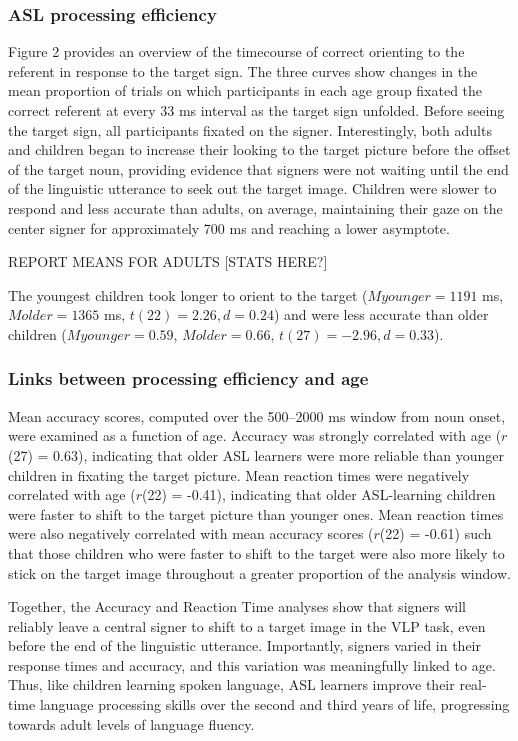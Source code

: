 \documentclass[12pt,]{article}
\begin{document}
\subsubsection{ASL processing
efficiency}\label{asl-processing-efficiency}

Figure 2 provides an overview of the timecourse of correct orienting to
the referent in response to the target sign. The three curves show
changes in the mean proportion of trials on which participants in each
age group fixated the correct referent at every 33 ms interval as the
target sign unfolded. Before seeing the target sign, all participants
fixated on the signer. Interestingly, both adults and children began to
increase their looking to the target picture before the offset of the
target noun, providing evidence that signers were not waiting until the
end of the linguistic utterance to seek out the target image. Children
were slower to respond and less accurate than adults, on average,
maintaining their gaze on the center signer for approximately 700 ms and
reaching a lower asymptote.

REPORT MEANS FOR ADULTS {[}STATS HERE?{]}

The youngest children took longer to orient to the target
(\(Myounger = 1191\) ms, \(Molder = 1365\) ms,
\(t(22) = 2.26, d = 0.24\)) and were less accurate than older children
(\(Myounger = 0.59\), \(Molder = 0.66\), \(t(27) = -2.96, d = 0.33\)).

\subsubsection{Links between processing efficiency and
age}\label{links-between-processing-efficiency-and-age}

Mean accuracy scores, computed over the 500--2000 ms window from noun
onset, were examined as a function of age. Accuracy was strongly
correlated with age (\(r\)(27) = 0.63), indicating that older ASL
learners were more reliable than younger children in fixating the target
picture. Mean reaction times were negatively correlated with age
(\(r\)(22) = -0.41), indicating that older ASL-learning children were
faster to shift to the target picture than younger ones. Mean reaction
times were also negatively correlated with mean accuracy scores
(\(r\)(22) = -0.61) such that those children who were faster to shift to
the target were also more likely to stick on the target image throughout
a greater proportion of the analysis window.

Together, the Accuracy and Reaction Time analyses show that signers will
reliably leave a central signer to shift to a target image in the VLP
task, even before the end of the linguistic utterance. Importantly,
signers varied in their response times and accuracy, and this variation
was meaningfully linked to age. Thus, like children learning spoken
language, ASL learners improve their real-time language processing
skills over the second and third years of life, progressing towards
adult levels of language fluency.
\end{document}
